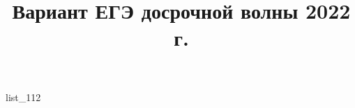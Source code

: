 \documentclass[12pt, a4paper]{article}
\begin{document}
	\title{Вариант ЕГЭ досрочной волны 2022 г.}
	{list_112}
\end{document}
